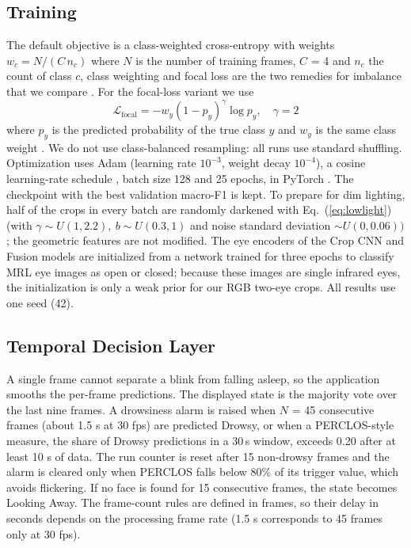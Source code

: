 \documentclass[conference]{IEEEtran}
\begin{document}
\subsection{Training}\label{sec:train}
The default objective is a class-weighted cross-entropy with weights
$w_c = N/(C\,n_c)$ where $N$ is the number of training frames, $C$ = 4 and $n_c$ the count of class $c$, class weighting and focal loss are the two remedies for imbalance that we compare \cite{lin2017,ghosh2024}. For the focal-loss variant we use
\begin{equation}
\mathcal{L}_{\text{focal}} = -w_y (1-p_y)^\gamma \log p_y,
\quad \gamma = 2
\label{eq:focal_loss}
\end{equation}
where $p_y$ is the predicted probability of the true class $y$ and $w_y$ is the same class weight \cite{lin2017}. We do not use class-balanced resampling: all runs use standard shuffling. Optimization uses Adam \cite{kingma2015} (learning rate $10^{-3}$, weight decay $10^{-4}$), a cosine learning-rate schedule \cite{loshchilov2017}, batch size 128 and 25 epochs, in PyTorch \cite{paszke2019}. The checkpoint with the best validation macro-F1 is kept. To prepare for dim lighting, half of the crops in every batch are randomly darkened with Eq.~(\ref{eq:lowlight}) (with $\gamma \sim U(1, 2.2),\ b \sim U(0.3, 1)$ and noise standard deviation $\sim U(0, 0.06))$; the geometric features are not modified.
The eye encoders of the Crop CNN and Fusion models are initialized from a network trained for three epochs to classify MRL eye images as open or closed; because these images are single infrared eyes, the initialization is only a weak prior for our RGB two-eye crops. All results use one seed (42).

\subsection{Temporal Decision Layer}\label{sec:temporal}
A single frame cannot separate a blink from falling asleep, so the application smooths the per-frame predictions. The displayed state is the majority vote over the last nine frames. A drowsiness alarm is raised when $N$ = 45 consecutive frames (about 1.5 s at 30 fps) are predicted Drowsy, or when a PERCLOS-style measure, the share of Drowsy predictions in a 30\,s window, exceeds 0.20 after at least 10 s of data. The run counter is reset after 15 non-drowsy frames and the alarm is cleared only when PERCLOS falls below 80\% of its trigger value, which avoids flickering. If no face is found for 15 consecutive frames, the state becomes Looking Away. The frame-count rules are defined in frames, so their delay in seconds depends on the processing frame rate (1.5 s corresponds to 45 frames only at 30 fps).
\end{document}
